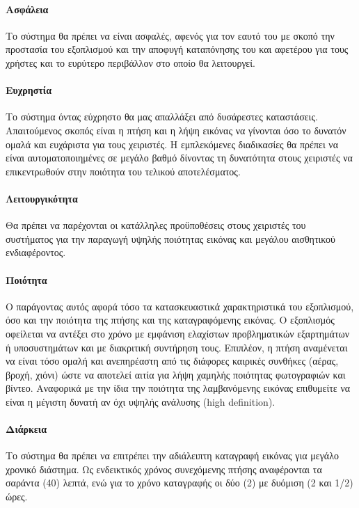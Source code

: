 \documentclass[a4paper, 12pt, twoside]{report}
\begin{document}
			\paragraph{Ασφάλεια}{Το σύστημα θα πρέπει να είναι ασφαλές, αφενός για τον εαυτό του με σκοπό την προστασία του εξοπλισμού και την αποφυγή καταπόνησης του και αφετέρου για τους χρήστες και το ευρύτερο περιβάλλον στο οποίο θα λειτουργεί.

 			\paragraph{Ευχρηστία}{Το σύστημα όντας εύχρηστο θα μας απαλλάξει από δυσάρεστες καταστάσεις. Απαιτούμενος σκοπός είναι η πτήση και η λήψη εικόνας να γίνονται όσο το δυνατόν ομαλά και ευχάριστα για τους χειριστές. Η εμπλεκόμενες διαδικασίες θα πρέπει να είναι αυτοματοποιημένες σε μεγάλο βαθμό δίνοντας τη δυνατότητα στους χειριστές να επικεντρωθούν στην ποιότητα του τελικού αποτελέσματος.

 			\paragraph{Λειτουργικότητα}{Θα πρέπει να παρέχονται οι κατάλληλες προϋποθέσεις στους χειριστές του συστήματος για την παραγωγή υψηλής ποιότητας εικόνας και μεγάλου αισθητικού ενδιαφέροντος.

 			\paragraph{Ποιότητα}{Ο παράγοντας αυτός αφορά τόσο τα κατασκευαστικά χαρακτηριστικά του εξοπλισμού, όσο και την ποιότητα της πτήσης και της καταγραφόμενης εικόνας. Ο εξοπλισμός οφείλεται να αντέξει στο χρόνο με εμφάνιση ελαχίστων προβληματικών εξαρτημάτων ή υποσυστημάτων και με διακριτική συντήρηση τους. Επιπλέον, η πτήση αναμένεται να είναι τόσο ομαλή και ανεπηρέαστη από τις διάφορες καιρικές συνθήκες (αέρας, βροχή, χιόνι) ώστε να αποτελεί αιτία για λήψη χαμηλής ποιότητας φωτογραφιών και βίντεο. Αναφορικά με την ίδια την ποιότητα της λαμβανόμενης εικόνας επιθυμείτε να είναι η μέγιστη δυνατή αν όχι υψηλής ανάλυσης (high definition).

 			\paragraph{Διάρκεια}{Το σύστημα θα πρέπει να επιτρέπει την αδιάλειπτη καταγραφή εικόνας για μεγάλο χρονικό διάστημα. Ως ενδεικτικός χρόνος συνεχόμενης πτήσης αναφέρονται τα σαράντα (40) λεπτά, ενώ για το χρόνο καταγραφής οι δύο (2)  με δυόμιση (2 και 1/2) ώρες.

}}}}}
\end{document}
